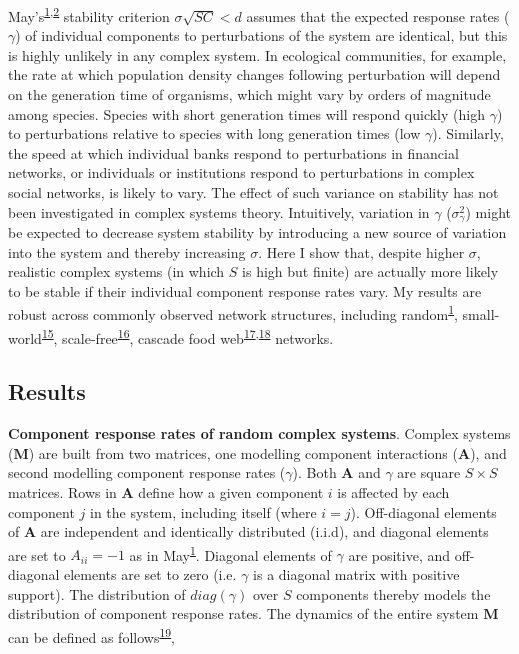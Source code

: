 \documentclass[]{article}
\begin{document}
May's\textsuperscript{\protect\hyperlink{ref-May1972}{1},\protect\hyperlink{ref-Allesina2012}{2}}
stability criterion \(\sigma\sqrt{SC} < d\) assumes that the expected
response rates (\(\gamma\)) of individual components to perturbations of
the system are identical, but this is highly unlikely in any complex
system. In ecological communities, for example, the rate at which
population density changes following perturbation will depend on the
generation time of organisms, which might vary by orders of magnitude
among species. Species with short generation times will respond quickly
(high \(\gamma\)) to perturbations relative to species with long
generation times (low \(\gamma\)). Similarly, the speed at which
individual banks respond to perturbations in financial networks, or
individuals or institutions respond to perturbations in complex social
networks, is likely to vary. The effect of such variance on stability
has not been investigated in complex systems theory. Intuitively,
variation in \(\gamma\) (\(\sigma^{2}_{\gamma}\)) might be expected to
decrease system stability by introducing a new source of variation into
the system and thereby increasing \(\sigma\). Here I show that, despite
higher \(\sigma\), realistic complex systems (in which \(S\) is high but
finite) are actually more likely to be stable if their individual
component response rates vary. My results are robust across commonly
observed network structures, including
random\textsuperscript{\protect\hyperlink{ref-May1972}{1}},
small-world\textsuperscript{\protect\hyperlink{ref-Watts1998}{15}},
scale-free\textsuperscript{\protect\hyperlink{ref-Albert2002}{16}},
cascade food
web\textsuperscript{\protect\hyperlink{ref-Solow1998}{17},\protect\hyperlink{ref-Williams2000}{18}}
networks.

\subsection{Results}\label{results}

\textbf{Component response rates of random complex systems}. Complex
systems (\(\mathbf{M}\)) are built from two matrices, one modelling
component interactions (\(\mathbf{A}\)), and second modelling component
response rates (\(\gamma\)). Both \(\mathbf{A}\) and \(\gamma\) are
square \(S \times S\) matrices. Rows in \(\mathbf{A}\) define how a
given component \(i\) is affected by each component \(j\) in the system,
including itself (where \(i = j\)). Off-diagonal elements of
\(\mathbf{A}\) are independent and identically distributed (i.i.d), and
diagonal elements are set to \(A_{ii} = -1\) as in
May\textsuperscript{\protect\hyperlink{ref-May1972}{1}}. Diagonal
elements of \(\gamma\) are positive, and off-diagonal elements are set
to zero (i.e. \(\gamma\) is a diagonal matrix with positive support).
The distribution of \(diag(\gamma)\) over \(S\) components thereby
models the distribution of component response rates. The dynamics of the
entire system \(\mathbf{M}\) can be defined as
follows\textsuperscript{\protect\hyperlink{ref-Patel2018}{19}},
\end{document}
